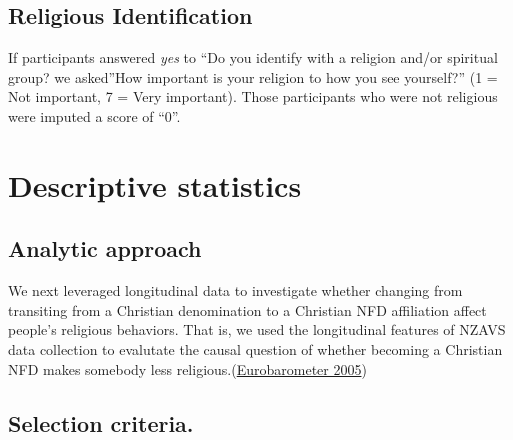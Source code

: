 \documentclass[
  singlecolumn]{report}
\begin{document}
\hypertarget{religious-identification}{%
\subsection{Religious Identification}\label{religious-identification}}

If participants answered \emph{yes} to ``Do you identify with a religion
and/or spiritual group? we asked''How important is your religion to how
you see yourself?'' (1 = Not important, 7 = Very important). Those
participants who were not religious were imputed a score of ``0''.

\hypertarget{descriptive-statistics}{%
\section{Descriptive statistics}\label{descriptive-statistics}}

\hypertarget{analytic-approach}{%
\subsection{Analytic approach}\label{analytic-approach}}

We next leveraged longitudinal data to investigate whether changing from
transiting from a Christian denomination to a Christian NFD affiliation
affect people's religious behaviors. That is, we used the longitudinal
features of NZAVS data collection to evalutate the causal question of
whether becoming a Christian NFD makes somebody less
religious.(\protect\hyperlink{ref-eurobarometer2005b}{Eurobarometer
2005})

\hypertarget{selection-criteria.}{%
\subsection{Selection criteria.}\label{selection-criteria.}}
\end{document}
